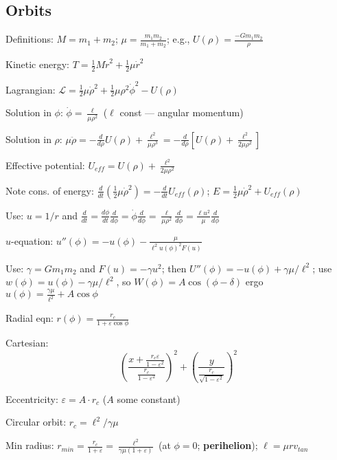 \documentclass[letterpaper,landscape,10pt]{article}
\newenvironment{mydescription}
{\begin{description}
	\setlength{\itemsep}{0pt}
	\setlength{\parskip}{0pt}
	\setlength{\parsep}{-1pt}}
{\end{description}}
\begin{document}
{\begin{multicols}{3}
	\subsection*{Orbits}
		\begin{mydescription}
		  \item[Definitions:] $M=m_1+m_2$; $\mu=\frac{m_1m_2}{m_1+m_2}$; e.g., $U(\rho)=\frac{-Gm_1m_2}{\rho}$
		  \item[Kinetic energy:] $T=\frac{1}{2}M\dot{r}^2+\frac{1}{2}\mu\dot{r}^2$
		  \item[Lagrangian:] $\mathscr{L}=\frac{1}{2}\mu\dot{\rho}^2+\frac{1}{2}\mu{\rho}^2\dot{\phi}^2-U(\rho)$
		  \item[Solution in $\phi$:] $\dot\phi=\frac{\ell}{\mu\rho^2}$ ($\ell$ const --- angular momentum)
		  \item[Solution in $\rho$:] $\mu\ddot{\rho}=-\frac{d}{d\rho}U(\rho) + \frac{\ell^2}{\mu\rho^3} = -\frac{d}{d\rho}\left[U(\rho)+\frac{\ell^2}{2\mu\rho^2}\right]$
		  \item[Effective potential:]$U_{eff}=U(\rho)+\frac{\ell^2}{2\mu\rho^2}$
		  \item[Note cons. of energy:] $\frac{d}{dt}\left( \frac{1}{2}\mu\dot\rho^2 \right) = -\frac{d}{dt}U_{eff}(\rho)$; $E=\frac{1}{2}\mu\dot\rho^2+U_{eff}(\rho)$
		  \item[Use:]$u=1/r$ and $\frac{d}{dt}=\frac{d\phi}{dt}\frac{d}{d\phi}=\dot\phi\frac{d}{d\phi}=\frac{\ell}{\mu\rho^2}\frac{d}{d\phi}=\frac{\ell u^2}{\mu}\frac{d}{d\phi}$
		  \item[$u$-equation:]$u''(\phi)=-u(\phi)-\frac{\mu}{\ell^2u(\phi)^2F(u)}$
		  \item[Use:]$\gamma=Gm_1m_2$ and $F(u)=-\gamma u^2$; then $U''(\phi)=-u(\phi)+\gamma\mu/\ell^2$; use $w(\phi)=u(\phi)-\gamma\mu/\ell^2$, so $W(\phi)=A\cos(\phi-\delta)$ ergo $u(\phi)=\frac{\gamma\mu}{\ell^2}+A\cos\phi$
		  \item[Radial eqn:] $r(\phi)=\frac{r_c}{1+\varepsilon\cos\phi}$
		  \item[Cartesian:] $$\left( \frac{x+\frac{r_c\varepsilon}{1-\varepsilon^2}}{\frac{r_c}{1-\varepsilon^2}} \right)^2+\left( \frac{y}{\frac{r_c}{\sqrt{1-\varepsilon^2}}} \right)^2$$
		  \item[Eccentricity:] $\varepsilon=A\cdot r_c$ ($A$ some constant)
		  \item[Circular orbit:] $r_c=\ell^2/\gamma\mu$
		  \item[Min radius:] $r_{min}=\frac{r_c}{1+\varepsilon}=\frac{\ell^2}{\gamma\mu(1+\varepsilon)}$ (at $\phi=0$; \textbf{perihelion}); $\ell=\mu rv_{tan}$

\end{mydescription}
\end{multicols}}
\end{document}
